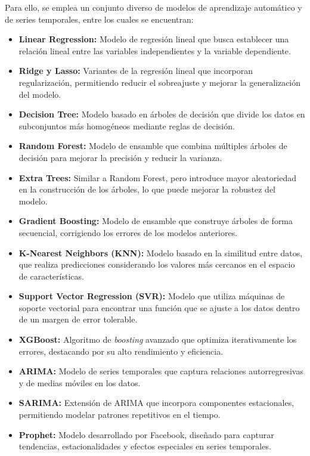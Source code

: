 Para ello, se emplea un conjunto diverso de modelos de aprendizaje automático y de series temporales, entre los cuales se encuentran:

\begin{itemize}
    \item \textbf{Linear Regression:} Modelo de regresión lineal que busca establecer una relación lineal entre las variables independientes y la variable dependiente.
    \item \textbf{Ridge y Lasso:} Variantes de la regresión lineal que incorporan regularización, permitiendo reducir el sobreajuste y mejorar la generalización del modelo.
    \item \textbf{Decision Tree:} Modelo basado en árboles de decisión que divide los datos en subconjuntos más homogéneos mediante reglas de decisión.
    \item \textbf{Random Forest:} Modelo de ensamble que combina múltiples árboles de decisión para mejorar la precisión y reducir la varianza.
    \item \textbf{Extra Trees:} Similar a Random Forest, pero introduce mayor aleatoriedad en la construcción de los árboles, lo que puede mejorar la robustez del modelo.
    \item \textbf{Gradient Boosting:} Modelo de ensamble que construye árboles de forma secuencial, corrigiendo los errores de los modelos anteriores.
    \item \textbf{K-Nearest Neighbors (KNN):} Modelo basado en la similitud entre datos, que realiza predicciones considerando los valores más cercanos en el espacio de características.
    \item \textbf{Support Vector Regression (SVR):} Modelo que utiliza máquinas de soporte vectorial para encontrar una función que se ajuste a los datos dentro de un margen de error tolerable.
    \item \textbf{XGBoost:} Algoritmo de \textit{boosting} avanzado que optimiza iterativamente los errores, destacando por su alto rendimiento y eficiencia.
    \item \textbf{ARIMA:} Modelo de series temporales que captura relaciones autorregresivas y de medias móviles en los datos.
    \item \textbf{SARIMA:} Extensión de ARIMA que incorpora componentes estacionales, permitiendo modelar patrones repetitivos en el tiempo.
    \item \textbf{Prophet:} Modelo desarrollado por Facebook, diseñado para capturar tendencias, estacionalidades y efectos especiales en series temporales.
\end{itemize}

